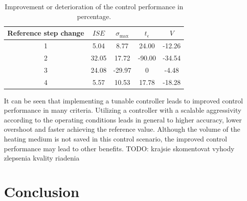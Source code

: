 \documentclass[preprint,12pt]{elsarticle}
\begin{document}
\begin{table}[h!]
	\begin{center}
		\caption{Improvement or deterioration of the control performance in percentage.}
		\label{tab:improvement}
		\begin{tabular}{c|c|c|c|c} 
			Reference step change & $ISE$ & $\sigma_{\mathrm{max}}$ & $t_{\epsilon}$ & $V$ \\
			\hline
			1 & 5.04 & 8.77 & 24.00 & -12.26 \\ 
			\hline
			2 & 32.05 & 17.72 & -90.00 & -34.54 \\ 
			\hline
			3 & 24.08 & -29.97 & 0 & -4.48 \\ 
			\hline
			4 & 5.57 & 10.53 & 17.78 & -18.28  
		\end{tabular}
	\end{center}
\end{table}

It can be seen that implementing a tunable controller leads to improved control performance in many criteria. Utilizing a controller with a scalable aggressivity according to the operating conditions leads in general to higher accuracy, lower overshoot and faster achieving the reference value. %
Although the volume of the heating medium is not saved in this control scenario, the improved control performance may lead to other benefits. 
TODO: krajsie skomentovat vyhody zlepsenia kvality riadenia

\section{Conclusion}
\label{sec:conclusion}





 



%
%
%
\end{document}
